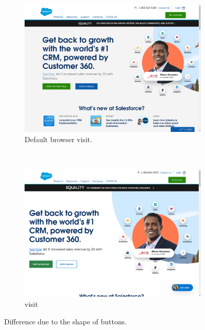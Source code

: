 \begin{figure}[t]
    \centering
    \begin{subfigure}{0.48\linewidth}
        \centering
            \includegraphics[width=\textwidth]{figs/38_normal.png}%
        \caption{Default browser visit.}
        \label{fig:coarse_normal}
    \end{subfigure}
    ~
    \begin{subfigure}{0.48\linewidth}
        \centering
            \includegraphics[width=\textwidth]{figs/38_sp.png}
        \caption{\spartacus visit}
        \label{fig:coarse_sp}
    \end{subfigure}
    
    \caption{Difference due to the shape of buttons.}
    \label{fig:coarse}
\end{figure}

